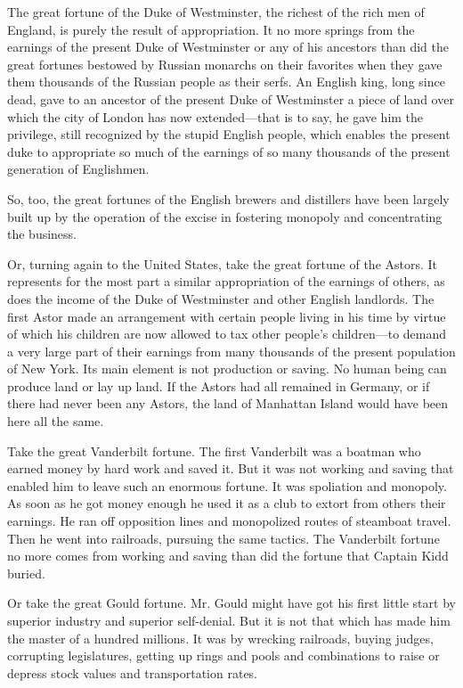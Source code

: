 \documentclass{book}
\begin{document}
The great fortune of the Duke of Westminster, the richest of the rich men of England, is purely the result of appropriation. It no more springs from the earnings of the present Duke of Westminster or any of his ancestors than did the great fortunes bestowed by Russian monarchs on their favorites when they gave them thousands of the Russian people as their serfs. An English king, long since dead, gave to an ancestor of the present Duke of Westminster a piece of land over which the city of London has now extended—that is to say, he gave him the privilege, still recognized by the stupid English people, which enables the present duke to appropriate so much of the earnings of so many thousands of the present generation of Englishmen.

So, too, the great fortunes of the English brewers and distillers have been largely built up by the operation of the excise in fostering monopoly and concentrating the business.

Or, turning again to the United States, take the great fortune of the Astors. It represents for the most part a similar appropriation of the earnings of others, as does the income of the Duke of Westminster and other English landlords. The first Astor made an arrangement with certain people living in his time by virtue of which his children are now allowed to tax other people’s children—to demand a very large part of their earnings from many thousands of the present population of New York. Its main element is not production or saving. No human being can produce land or lay up land. If the Astors had all remained in Germany, or if there had never been any Astors, the land of Manhattan Island would have been here all the same.

Take the great Vanderbilt fortune. The first Vanderbilt was a boatman who earned money by hard work and saved it. But it was not working and saving that enabled him to leave such an enormous fortune. It was spoliation and monopoly. As soon as he got money enough he used it as a club to extort from others their earnings. He ran off opposition lines and monopolized routes of steamboat travel. Then he went into railroads, pursuing the same tactics. The Vanderbilt fortune no more comes from working and saving than did the fortune that Captain Kidd buried.

Or take the great Gould fortune. Mr. Gould might have got his first little start by superior industry and superior self-denial. But it is not that which has made him the master of a hundred millions. It was by wrecking railroads, buying judges, corrupting legislatures, getting up rings and pools and combinations to raise or depress stock values and transportation rates.
\end{document}
